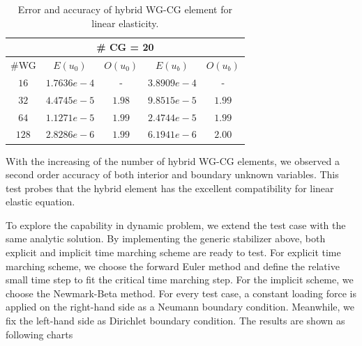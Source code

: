       \begin{table}[h]
      	\setlength{\tabcolsep}{2pt} {
      		\caption{ Error and accuracy of hybrid WG-CG element for linear elasticity.}
      		\label{Tab:hwgcg l1}
      		\vspace{-5pt}
      		\begin{center}
      			\begin{tabular}{c|c|c|c|c}
      				\hline
      				\multicolumn{5}{c}{\# CG = 20} \\
      				\hline
      				\#WG & $ E (u_{0}) $ & $ O(u_{0}) $ & $ E(u_{b})  $& $ O(u_{b})  $\\
      				\hline
      				$ 16 $ & $ 1.7636e-4 $ & - & $ 3.8909e-4 $ & - \\
      				\hline
      				$ 32 $ & $ 4.4745e-5 $ & $ 1.98 $& $ 9.8515e-5 $ & $ 1.99 $ \\
      				\hline
      				$ 64 $ & $ 1.1271e-5 $ & $ 1.99 $ & $ 2.4744e-5 $ & $ 1.99 $ \\
      				\hline
      				$ 128 $ & $ 2.8286e-6 $ & $ 1.99 $ & $ 6.1941e-6 $ & $ 2.00 $\\
      				\hline
      			\end{tabular}
      		\end{center} }
      	\end{table}
      	
      	With the increasing of the number of hybrid WG-CG elements, we observed a second order accuracy of both interior and boundary unknown variables. This test probes that the hybrid element has the excellent compatibility for linear elastic equation.
      	
      	To explore the capability in dynamic problem, we extend the test case with the same analytic solution. By implementing the generic stabilizer above, both explicit and implicit time marching scheme are ready to test. For explicit time marching scheme, we choose the forward Euler method\cite{jameson1991time} and define the relative small time step to fit the critical time marching step\cite{cundall1979discrete}. For the implicit scheme, we choose the Newmark-Beta method\cite{hahn1991modified}. For every test case, a constant loading force is applied on the right-hand side as a Neumann boundary condition\cite{ng1999fast}. Meanwhile, we fix the left-hand side as Dirichlet boundary condition. The results are shown as following charts
      	
